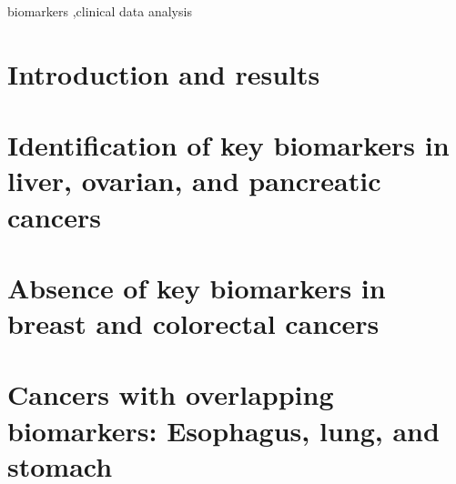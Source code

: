 \documentclass[preprint,12pt]{elsarticle}
\begin{document}
\begin{frontmatter}

\begin{abstract}

\end{abstract}

\begin{keyword}
biomarkers \sep clinical data analysis

\end{keyword}

\end{frontmatter}



\section{Introduction and results}\label{Introduction}

\section{Identification of key biomarkers in liver, ovarian, and pancreatic cancers} \label{sec2}

\section{Absence of key biomarkers in breast and colorectal cancers} \label{sec3}

\section{Cancers with overlapping biomarkers: Esophagus, lung, and stomach} \label{sec4}

\begin{thebibliography}{99}

\end{thebibliography}
\end{document}
